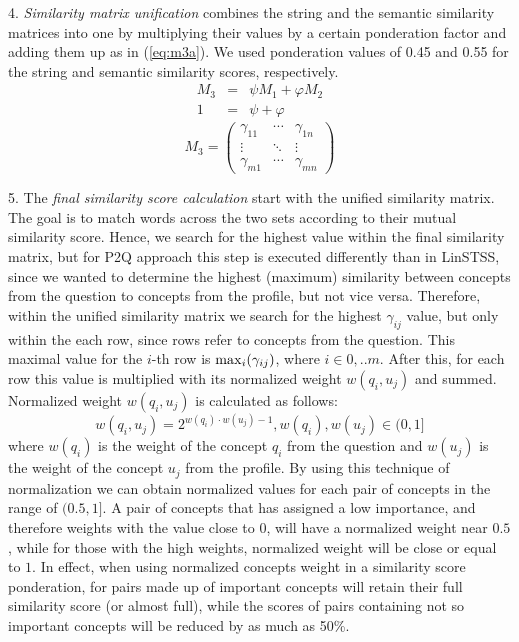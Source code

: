 \documentclass[conference]{IEEEtran}
\begin{document}
4. {\it Similarity matrix unification} combines the string and the semantic similarity matrices into one by multiplying their values by a certain ponderation factor and adding them up as in (\ref{eq:m3a}). We used ponderation values of 0.45 and 0.55 for the string and semantic similarity scores, respectively.
\begin{eqnarray}
	\label{eq:m3a}
	M_3 & = & \psi M_1 + \varphi M_2 \\
	1 & = & \psi + \varphi
\end{eqnarray}
\begin{equation}
	\label{eq:m3b}
	M_3 = 
\left( 
	\begin{array}{ccc}
		\gamma_{11} & \cdots & \gamma_{1n} \\
		\vdots & \ddots & \vdots \\
		\gamma_{m1} & \cdots & \gamma_{mn} 
	\end{array} 
\right)
\end{equation}

5. 	The {\it final similarity score calculation} start with the unified similarity matrix. The goal is to match words across the two sets according to their mutual similarity score. Hence, we search for the highest value within the final similarity matrix, but for P2Q approach this step is executed differently than in LinSTSS, since we wanted to determine the highest (maximum) similarity between concepts from the question to concepts from the profile, but not vice versa. Therefore, within the unified similarity matrix we search for the highest $\gamma_{ij}$ value, but only within the each row, since rows refer to concepts from the question. This maximal value for the $i$-th row is ${\rm max}_i(\gamma_{ij})$, where $i \in 0,..m$. After this, for each row this value is multiplied with its normalized weight $w(q_i,u_j)$ and summed. Normalized weight $w(q_i,u_j)$ is calculated as follows:
\begin{equation}
	\label{eq:normweight}
	w(q_i,u_j)=2^{w(q_i)\cdot w(u_j)-1},  w(q_i),w(u_j)\in (0,1]
\end{equation}
where $w(q_i)$ is the weight of the concept $q_i$ from the question and $w(u_j)$ is the weight of the concept $u_j$ from the profile. By using this technique of normalization we can obtain normalized values for each pair of concepts in the range of $(0.5, 1]$. A pair of concepts that has assigned a low importance, and therefore weights with the value close to $0$, will have a normalized weight near $0.5$, while for those with the high weights, normalized weight will be close or equal to $1$. In effect, when using normalized concepts weight in a similarity score ponderation, for pairs made up of important concepts will retain their full similarity score (or almost full), while the scores of pairs containing not so important concepts will be reduced by as much as 50\%.
\end{document}
